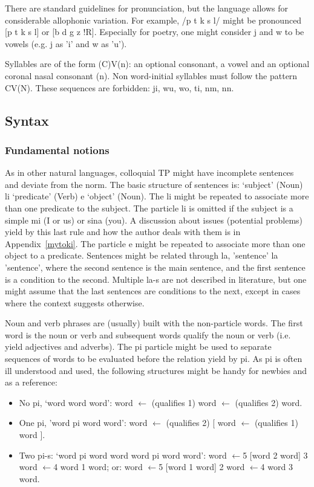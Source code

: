 There are standard guidelines for pronunciation,
but the language allows for considerable allophonic
variation.
For example, /p t k s l/ might be pronounced
[p t k s l] or [b d g z !R].
Especially for poetry, one might consider
j and w to be vowels
(e.g. j as 'i' and w as 'u').

Syllables are of the form (C)V(n):
an optional consonant, a vowel and an optional coronal nasal consonant
(n).
Non word-initial syllables must follow the pattern CV(N).
These sequences are forbidden: ji, wu, wo, ti, nm, nn.

\subsection{Syntax}\label{syntax}
\subsubsection{Fundamental notions}
As in other natural languages, 
colloquial TP might have
incomplete sentences and deviate from the
norm.
The basic structure of sentences is:
`subject' (Noun) li `predicate' (Verb) e `object' (Noun).
The li might be repeated to associate more than
one predicate to the subject.
The particle li is omitted if the subject is a simple mi (I or us)
or sina (you). A discussion about issues (potential problems)
yield by this last rule
and how the author deals with them is in Appendix~\ref{mytoki}.
The particle e might be repeated to associate more than
one object to a predicate.
Sentences might be related through la,
'sentence' la 'sentence', where the second sentence is
the main sentence, and the first sentence is a condition
to the second.
Multiple la-s are not described in literature,
but one might assume that the last sentences
are conditions to the next,
except in cases where the context suggests
otherwise.

Noun and verb phrases are (usually) built with the non-particle words.
The first word is the noun or verb and subsequent words
qualify the noun or verb (i.e. yield adjectives and adverbs).
The pi particle might be used to separate sequences of words
to be evaluated before the relation yield by pi.
As pi is often ill understood and used,
the following structures might be handy for newbies and as a
reference:
\begin{itemize}
  \item No pi, `word word word':
word $\leftarrow$ (qualifies 1) word $\leftarrow$ (qualifies 2)  word.
  \item One pi, 'word pi word word': word $\leftarrow$ (qualifies 2) [
      word $\leftarrow$ (qualifies 1)  word ].
  \item Two pi-s: `word pi word word word pi word word':
    word $\leftarrow$5 [word 2 word] 3 word $\leftarrow$4 word 1  word;
or:
    word $\leftarrow$5 [word 1 word] 2 word $\leftarrow$4 word 3  word.
\end{itemize}

